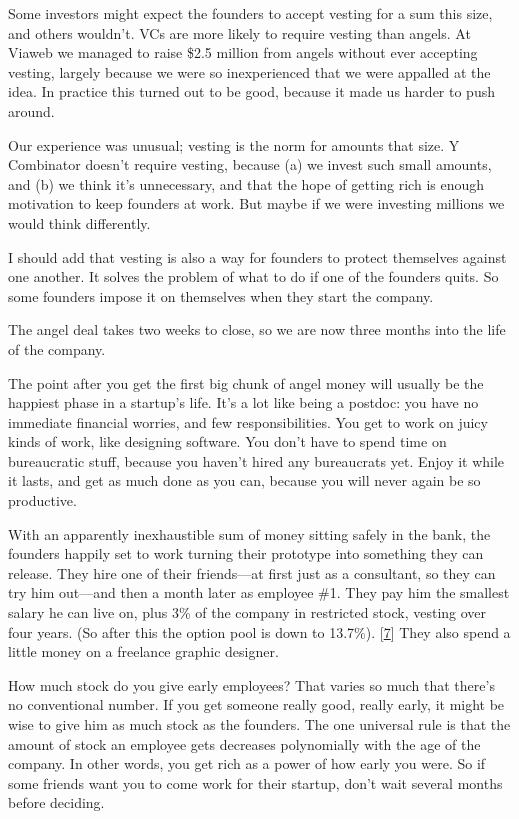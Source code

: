 Some investors might expect the founders to accept vesting for a sum
this size, and others wouldn't. VCs are more likely to require vesting
than angels. At Viaweb we managed to raise \$2.5 million from angels
without ever accepting vesting, largely because we were so inexperienced
that we were appalled at the idea. In practice this turned out to be
good, because it made us harder to push around.

Our experience was unusual; vesting is the norm for amounts that size. Y
Combinator doesn't require vesting, because (a) we invest such small
amounts, and (b) we think it's unnecessary, and that the hope of getting
rich is enough motivation to keep founders at work. But maybe if we were
investing millions we would think differently.

I should add that vesting is also a way for founders to protect
themselves against one another. It solves the problem of what to do if
one of the founders quits. So some founders impose it on themselves when
they start the company.

The angel deal takes two weeks to close, so we are now three months into
the life of the company.

The point after you get the first big chunk of angel money will usually
be the happiest phase in a startup's life. It's a lot like being a
postdoc: you have no immediate financial worries, and few
responsibilities. You get to work on juicy kinds of work, like designing
software. You don't have to spend time on bureaucratic stuff, because
you haven't hired any bureaucrats yet. Enjoy it while it lasts, and get
as much done as you can, because you will never again be so productive.

With an apparently inexhaustible sum of money sitting safely in the
bank, the founders happily set to work turning their prototype into
something they can release. They hire one of their friends---at first
just as a consultant, so they can try him out---and then a month later
as employee \#1. They pay him the smallest salary he can live on, plus
3\% of the company in restricted stock, vesting over four years. (So
after this the option pool is down to 13.7\%). {[}\hyperref[f7n]{7}{]}
They also spend a little money on a freelance graphic designer.

How much stock do you give early employees? That varies so much that
there's no conventional number. If you get someone really good, really
early, it might be wise to give him as much stock as the founders. The
one universal rule is that the amount of stock an employee gets
decreases polynomially with the age of the company. In other words, you
get rich as a power of how early you were. So if some friends want you
to come work for their startup, don't wait several months before
deciding.

